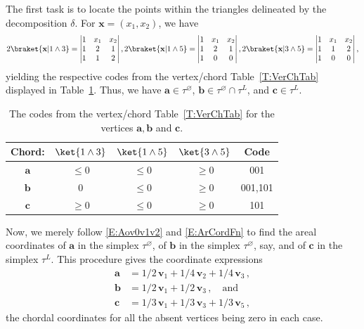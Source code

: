 \documentclass[12pt]{amsart}
\theoremstyle{plain}
\theoremstyle{definition}
\numberwithin{equation}{section}
\begin{document}
The first task is to locate the points within the triangles delineated by the decomposition $\delta$. For $\mathbf x=(x_1,x_2)$, we have
\begin{align*}
2\braket{\mathbf x|1\wedge3}=
\begin{vmatrix}
1 &x_1 &x_2\\
1 &2 &1\\
1 &1 &2
\end{vmatrix},
2\braket{\mathbf x|1\wedge5}=
\begin{vmatrix}
1 &x_1 &x_2\\
1 &2 &1\\
1 &0 &0
\end{vmatrix},
2\braket{\mathbf x|3\wedge5}=
\begin{vmatrix}
1 &x_1 &x_2\\
1 &1 &2\\
1 &0 &0
\end{vmatrix},
\end{align*}
yielding the respective codes from the vertex/chord Table~\ref{T:VerChTab} displayed in Table~\ref{T:abcVChTb}. Thus, we have $\mathbf a\in\tau^{\varnothing}$, $\mathbf b\in\tau^{\varnothing}\cap\tau^L$, and $\mathbf c\in\tau^L$.




\renewcommand{\arraystretch}{1.5}
\begin{table}[htb]
\begin{tabular}{||c||c|c|c||c||}
\hline
Chord: &$\ket{1\wedge3}$ &$\ket{1\wedge5}$ &$\ket{3\wedge5}$ &Code\\
\hline
$\mathbf a$ &$\le0$ &$\le0$ &$\ge0$ &001\\
\hline
$\mathbf b$ &$0$ &$\le0$ &$\ge0$ &001,101\\
\hline
$\mathbf c$ &$\ge0$ &$\le0$ &$\ge0$ &101\\
\hline
\end{tabular}
\vskip 4mm
\caption{The codes from the vertex/chord Table~\ref{T:VerChTab} for the vertices $\mathbf a,\mathbf b$ and $\mathbf c$.
}
\label{T:abcVChTb}
\end{table}


Now, we merely follow \eqref{E:Aov0v1v2} and \eqref{E:ArCordFn} to find the areal coordinates of $\mathbf a$ in the simplex $\tau^{\varnothing}$, of $\mathbf b$ in the simplex $\tau^{\varnothing}$, say, and of $\mathbf c$ in the simplex $\tau^L$. This procedure gives the coordinate expressions
\begin{align*}
\mathbf a &= 1/2 \, \mathbf v_1 + 1/4 \, \mathbf v_2 + 1/4 \, \mathbf v_3\,,\\
\mathbf b &= 1/2 \, \mathbf v_1 + 1/2 \, \mathbf v_3\,,\quad \mbox{and}\\
\mathbf c &= 1/3 \, \mathbf v_1 + 1/3 \, \mathbf v_3 + 1/3 \, \mathbf v_5\,,
\end{align*}
the chordal coordinates for all the absent vertices being zero in each case.
\end{document}
